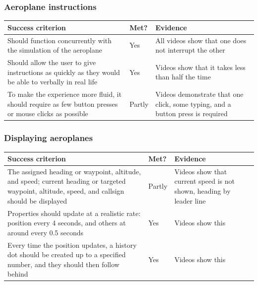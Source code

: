 \documentclass{article}
\begin{document}
\subsubsection{Aeroplane instructions}\label{aeroplaneinstructionssuccess}
\begin{table}[ht]
\centering
\begin{tabular}{| p{} | p{} | p{} |}
\hline
\textbf{Success criterion} & \textbf{Met?} & \textbf{Evidence} \\
\hline
Should function concurrently with the simulation of the aeroplane & Yes & All videos show that one does not interrupt the other \\
\hline
Should allow the user to give instructions as quickly as they would
be able to verbally in real life & Yes & Videos show that it takes less than half the time \\
\hline
To make the experience more fluid, it should require as few button presses or mouse
clicks as possible & Partly & Videos demonstrate that one click, some typing, and a button press is required \\
\hline
\end{tabular}
\end{table}

\subsubsection{Displaying aeroplanes}\label{aeroplanedisplaysuccess}
\begin{table}[ht]
\centering
\begin{tabular}{| p{} | p{} | p{} |}
\hline
\textbf{Success criterion} & \textbf{Met?} & \textbf{Evidence} \\
\hline
The assigned heading or waypoint, altitude, and speed; current heading or targeted waypoint, altitude, speed, and callsign should be displayed & Partly & Videos show that current speed is not shown, heading by leader line \\
\hline
Properties should update at a realistic rate: position every 4 seconds, and others at around
every 0.5 seconds & Yes & Videos show this \\
\hline
Every time the position updates, a history dot should be created up to a specified number,
and they should then follow behind & Yes & Videos show this \\
\hline
\end{tabular}
\end{table}
\end{document}
